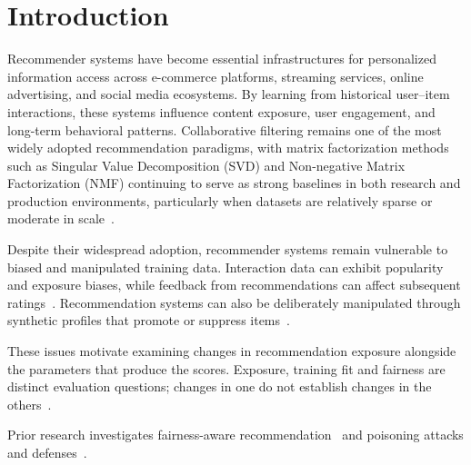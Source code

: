 \documentclass[information,article,submit,pdftex,moreauthors]{Definitions/mdpi}
\newif\ifrevisionnotes
\newcommand{\saracomment}[1]{\ifrevisionnotes\par\smallskip\noindent\textcolor{orange}{\textbf{Sara:} #1}\par\smallskip\fi}
\begin{document}
\saracomment{Converted ACM front matter, conference/copyright fields, keywords, bibliography and figure containers to the official MDPI Information article template. Preserved the manuscript's scientific values and previous Sara comments. Reorganized the article into Introduction, Related Work, Materials and Methods, Results, Discussion and Conclusions. Author declarations must be completed before submission.}
\ifrevisionnotes
\par\smallskip\noindent
\textcolor{green!50!black}{\textbf{Prof. Raj}}\quad
\textcolor{blue}{\textbf{Dr. Ravindra}}
\par\smallskip
\fi
\section{Introduction}
\label{sec:introduction}
Recommender systems have become essential infrastructures for personalized information access across e-commerce platforms, streaming services, online advertising, and social media ecosystems. By learning from historical user–item interactions, these systems influence content exposure, user engagement, and long-term behavioral patterns. Collaborative filtering remains one of the most widely adopted recommendation paradigms, with matrix factorization methods such as Singular Value Decomposition (SVD) and Non-negative Matrix Factorization (NMF) continuing to serve as strong baselines in both research and production environments, particularly when datasets are relatively sparse or moderate in scale~\cite{Isinkaye29092023}.

Despite their widespread adoption, recommender systems remain vulnerable to biased and manipulated training data. Interaction data can exhibit popularity and exposure biases, while feedback from recommendations can affect subsequent ratings~\cite{klimashevskaia2024survey,zhou2024longitudinal}. Recommendation systems can also be deliberately manipulated through synthetic profiles that promote or suppress items~\cite{li2016data,nguyen2024manipulating,wang2024poisoning}.

These issues motivate examining changes in recommendation exposure alongside the parameters that produce the scores. Exposure, training fit and fairness are distinct evaluation questions; changes in one do not establish changes in the others~\cite{raj2022measuring,JIN2023101906}.

Prior research investigates fairness-aware recommendation~\cite{JIN2023101906,wang2024counterfactual} and poisoning attacks and defenses~\cite{wang2024poisoning}.
\end{document}
